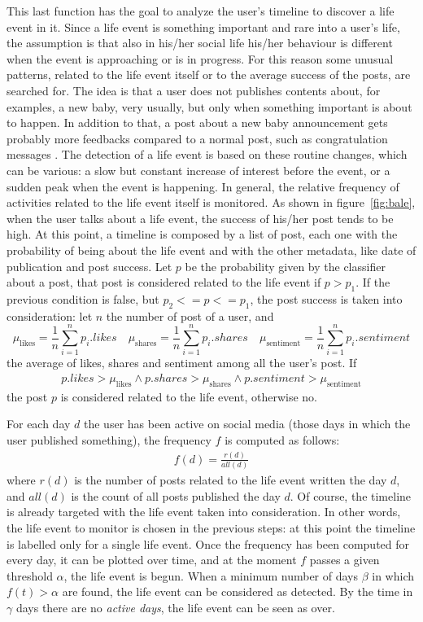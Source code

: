 This last function has the goal to analyze the user's timeline to discover a life event in it. Since a life event is something important and rare into a user's life, the assumption is that also in his/her social life his/her behaviour is different when the event is approaching or is in progress. For this reason some unusual patterns, related to the life event itself or to the average success of the posts, are searched for. The idea is that a user does not publishes contents about, for examples, a new baby, very usually, but only when something important is about to happen. In addition to that, a post about a new baby announcement gets probably more feedbacks compared to a normal post, such as congratulation messages \cite{dickinson2015identifying}. The detection of a life event is based on these routine changes, which can be various: a slow but constant increase of interest before the event, or a sudden peak when the event is happening. In general, the relative frequency of activities related to the life event itself is monitored. As shown in figure~\ref{fig:bale}, when the user talks about a life event, the success of his/her post tends to be high.
At this point, a timeline is composed by a list of post, each one with the probability of being about the life event and with the other metadata, like date of publication and post success. Let $p$ be the probability given by the classifier about a post, that post is considered related to the life event if $ p > p_1$. If the previous condition is false, but $p_2 <= p <= p_1 $, the post success is taken into consideration: let $n$ the number of post of a user, and
\[
\mu_\text{likes} = \frac{1}{n} \sum_{i=1}^n p_i.likes \quad \mu_\text{shares} = \frac{1}{n} \sum_{i=1}^n p_i.shares \quad \mu_\text{sentiment} = \frac{1}{n} \sum_{i=1}^n p_i.sentiment
\]
the average of likes, shares and sentiment among all the user's post. If 
\begin{gather}
\label{avgs}
p.likes > \mu_\text{likes} \land p.shares > \mu_\text{shares} \land p.sentiment > \mu_\text{sentiment}
\end{gather}
the post $p$ is considered related to the life event, otherwise no.

For each day $d$ the user has been active on social media (those days in which the user published something), the frequency $f$ is computed as follows:
\begin{gather}
f(d) = \frac{r(d)}{all(d)}
\label{freq}
\end{gather}
where $r(d)$ is the number of posts related to the life event written the day $d$, and $all(d)$ is the count of all posts published the day $d$. Of course, the timeline is already targeted with the life event taken into consideration. In other words, the life event to monitor is chosen in the previous steps: at this point the timeline is labelled only for a single life event. Once the frequency has been computed for every day, it can be plotted over time, and at the moment $f$ passes a given threshold $\alpha$, the life event is begun. When a minimum number of days $\beta$ in which $f(t) > \alpha$ are found, the life event can be considered as detected. By the time in $\gamma$ days there are no \emph{active days}, the life event can be seen as over.

